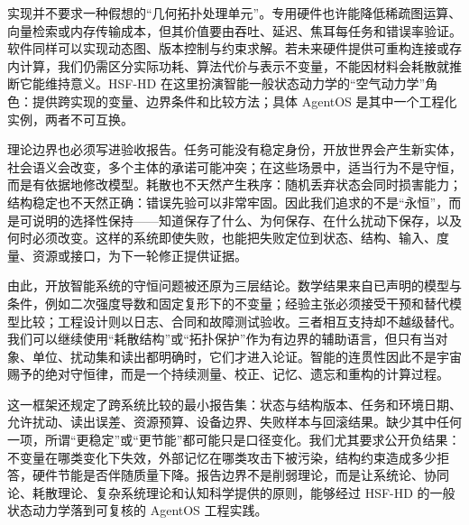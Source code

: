 实现并不要求一种假想的“几何拓扑处理单元”。专用硬件也许能降低稀疏图运算、向量检索或内存传输成本，但其价值要由吞吐、延迟、焦耳每任务和错误率验证。软件同样可以实现动态图、版本控制与约束求解。若未来硬件提供可重构连接或存内计算，我们仍需区分实际功耗、算法代价与表示不变量，不能因材料会耗散就推断它能维持意义。HSF-HD 在这里扮演智能一般状态动力学的“空气动力学”角色：提供跨实现的变量、边界条件和比较方法；具体 AgentOS 是其中一个工程化实例，两者不可互换。

理论边界也必须写进验收报告。任务可能没有稳定身份，开放世界会产生新实体，社会语义会改变，多个主体的承诺可能冲突；在这些场景中，适当行为不是守恒，而是有依据地修改模型。耗散也不天然产生秩序：随机丢弃状态会同时损害能力；结构稳定也不天然正确：错误先验可以非常牢固。因此我们追求的不是“永恒”，而是可说明的选择性保持——知道保存了什么、为何保存、在什么扰动下保存，以及何时必须改变。这样的系统即使失败，也能把失败定位到状态、结构、输入、度量、资源或接口，为下一轮修正提供证据。

由此，开放智能系统的守恒问题被还原为三层结论。数学结果来自已声明的模型与条件，例如二次强度导数和固定复形下的不变量；经验主张必须接受干预和替代模型比较；工程设计则以日志、合同和故障测试验收。三者相互支持却不越级替代。我们可以继续使用“耗散结构”或“拓扑保护”作为有边界的辅助语言，但只有当对象、单位、扰动集和读出都明确时，它们才进入论证。智能的连贯性因此不是宇宙赐予的绝对守恒律，而是一个持续测量、校正、记忆、遗忘和重构的计算过程。

这一框架还规定了跨系统比较的最小报告集：状态与结构版本、任务和环境日期、允许扰动、读出误差、资源预算、设备边界、失败样本与回滚结果。缺少其中任何一项，所谓“更稳定”或“更节能”都可能只是口径变化。我们尤其要求公开负结果：不变量在哪类变化下失效，外部记忆在哪类攻击下被污染，结构约束造成多少拒答，硬件节能是否伴随质量下降。报告边界不是削弱理论，而是让系统论、协同论、耗散理论、复杂系统理论和认知科学提供的原则，能够经过 HSF-HD 的一般状态动力学落到可复核的 AgentOS 工程实践。


